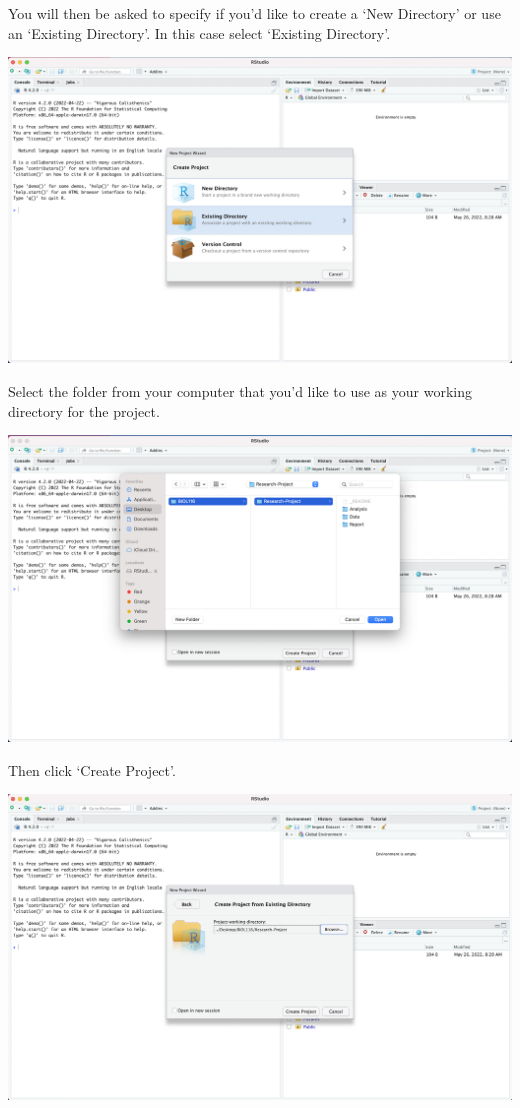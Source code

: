 \documentclass[
]{book}
\begin{document}
You will then be asked to specify if you'd like to create a `New Directory' or use an `Existing Directory'. In this case select `Existing Directory'.

\includegraphics{images/D_new-project-old-folder-2.png}

Select the folder from your computer that you'd like to use as your working directory for the project.

\includegraphics{images/D_new-project-old-folder-3.png}

Then click `Create Project'.

\includegraphics{images/D_new-project-old-folder-4.png}
\end{document}
